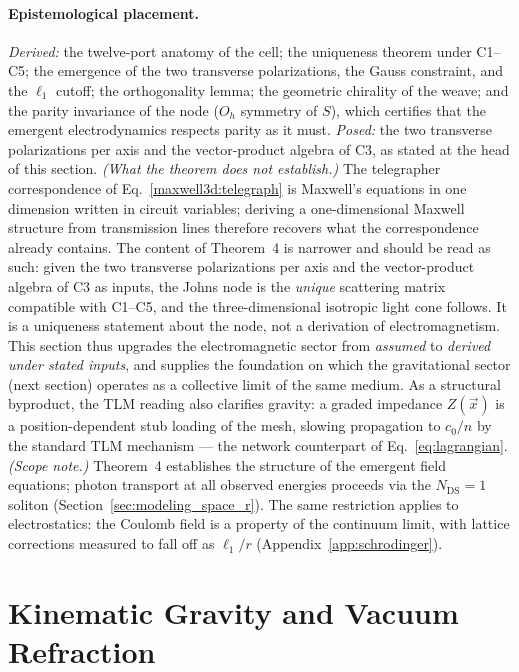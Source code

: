\documentclass[11pt,a4paper]{article}
\theoremstyle{plain}
\theoremstyle{remark}
\newcommand{\Ncd}{\ensuremath{N_{\mathrm{DS}}}}
\begin{document}
\paragraph{Epistemological placement.} \emph{Derived:} the twelve-port anatomy of the cell; the uniqueness theorem under C1--C5; the emergence of the two transverse polarizations, the Gauss constraint, and the $\ell_1$ cutoff; the orthogonality lemma; the geometric chirality of the weave; and the parity invariance of the node ($O_h$ symmetry of $S$), which certifies that the emergent electrodynamics respects parity as it must. \emph{Posed:} the two transverse polarizations per axis and the vector-product algebra of C3, as stated at the head of this section. \emph{(What the theorem does not establish.)} The telegrapher correspondence of Eq.~\eqref{maxwell3d:telegraph} is Maxwell's equations in one dimension written in circuit variables; deriving a one-dimensional Maxwell structure from transmission lines therefore recovers what the correspondence already contains. The content of Theorem~4 is narrower and should be read as such: given the two transverse polarizations per axis and the vector-product algebra of C3 as inputs, the Johns node is the \emph{unique} scattering matrix compatible with C1--C5, and the three-dimensional isotropic light cone follows. It is a uniqueness statement about the node, not a derivation of electromagnetism. This section thus upgrades the electromagnetic sector from \emph{assumed} to \emph{derived under stated inputs}, and supplies the foundation on which the gravitational sector (next section) operates as a collective limit of the same medium. As a structural byproduct, the TLM reading also clarifies gravity: a graded impedance $Z(\vec x)$ is a position-dependent stub loading of the mesh, slowing propagation to $c_0/n$ by the standard TLM mechanism --- the network counterpart of Eq.~\eqref{eq:lagrangian}. \emph{(Scope note.)} Theorem~4 establishes the structure of the emergent field equations; photon transport at all observed energies proceeds via the $\Ncd=1$ soliton (Section~\ref{sec:modeling_space_r}). The same restriction applies to electrostatics: the Coulomb field is a property of the continuum limit, with lattice corrections measured to fall off as $\ell_1/r$ (Appendix~\ref{app:schrodinger}).

\section{Kinematic Gravity and Vacuum Refraction}
\label{sec:kinematic_gravity}
\end{document}
